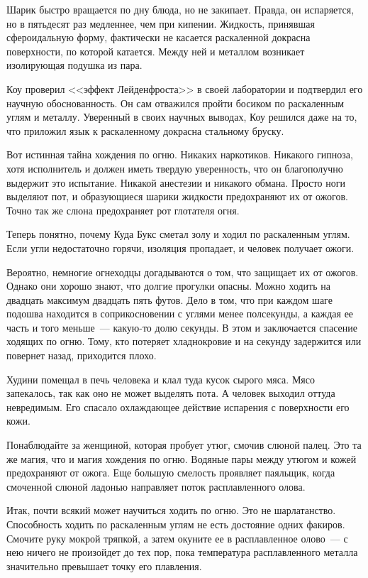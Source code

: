 \documentclass[12pt,a4paper,twoside,openany,svgnames]{memoir}
\begin{document}
Шарик быстро вращается по дну блюда, но не закипает. Правда, он испаряется, но в пятьдесят раз медленнее, чем при кипении. Жидкость, принявшая сфероидальную форму, фактически не касается раскаленной докрасна поверхности, по которой катается. Между ней и металлом возникает изолирующая подушка из пара.

Коу проверил <<эффект Лейденфроста>> в своей лаборатории и подтвердил его научную обоснованность. Он сам отважился пройти босиком по раскаленным углям и металлу. Уверенный в своих научных выводах, Коу решился даже на то, что приложил язык к раскаленному докрасна стальному бруску.

Вот истинная тайна хождения по огню. Никаких наркотиков. Никакого гипноза, хотя исполнитель и должен иметь твердую уверенность, что он благополучно выдержит это испытание. Никакой анестезии и никакого обмана. Просто ноги выделяют пот, и образующиеся шарики жидкости предохраняют их от ожогов. Точно так же слюна предохраняет рот глотателя огня.

Теперь понятно, почему Куда Букс сметал золу и ходил по раскаленным углям. Если угли недостаточно горячи, изоляция пропадает, и человек получает ожоги.

Вероятно, немногие огнеходцы догадываются о том, что защищает их от ожогов. Однако они хорошо знают, что долгие прогулки опасны. Можно ходить на двадцать максимум двадцать пять футов. Дело в том, что при каждом шаге подошва находится в соприкосновении с углями менее полсекунды, а каждая ее часть и того меньше~--- какую-то долю секунды. В этом и заключается спасение ходящих по огню. Тому, кто потеряет хладнокровие и на секунду задержится или повернет назад, приходится плохо.

Худини помещал в печь человека и клал туда кусок сырого мяса. Мясо запекалось, так как оно не может выделять пота. А человек выходил оттуда невредимым. Его спасало охлаждающее действие испарения с поверхности его кожи.

Понаблюдайте за женщиной, которая пробует утюг, смочив слюной палец. Это та же магия, что и магия хождения по огню. Водяные пары между утюгом и кожей предохраняют от ожога. Еще большую смелость проявляет паяльщик, когда смоченной слюной ладонью направляет поток расплавленного олова.

Итак, почти всякий может научиться ходить по огню. Это не шарлатанство. Способность ходить по раскаленным углям не есть достояние одних факиров. Смочите руку мокрой тряпкой, а затем окуните ее в расплавленное олово~--- с нею ничего не произойдет до тех пор, пока температура расплавленного металла значительно превышает точку его плавления.
\end{document}
